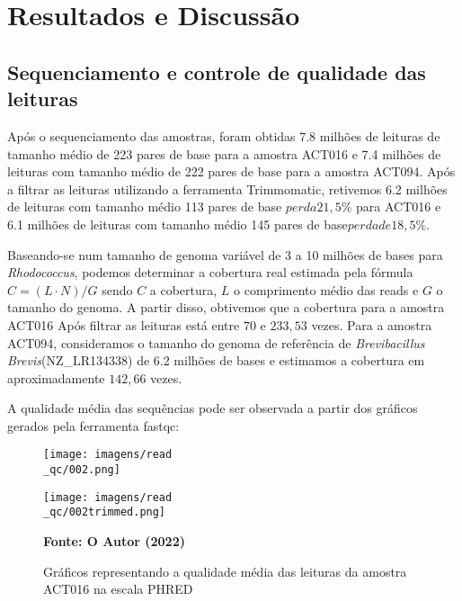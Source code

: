 \chapter{Resultados e Discussão}\label{cap:resultados}

\section{Sequenciamento e controle de qualidade das leituras}
Após o sequenciamento das amostras, foram obtidas 7.8 milhões de leituras de tamanho médio de 
223 pares de base para a amostra ACT016 e 7.4 milhões de leituras com tamanho médio de 222 pares de base
para a amostra ACT094. Após a filtrar as leituras utilizando a ferramenta Trimmomatic, retivemos
6.2 milhões de leituras com tamanho médio 113 pares de base \(perda 21,5\%\) para ACT016 e 6.1 milhões
de leituras com tamanho médio 145 pares de base\(perda de 18,5\%\).

Baseando-se num tamanho de genoma variável de 3 a 10 milhões de bases para \textit{Rhodococcus}, podemos
determinar a cobertura real estimada pela fórmula $C= (L\cdot N)/G $ sendo $C$ a cobertura, $L$ o comprimento
médio das reads e $G$ o tamanho do genoma. A partir disso, obtivemos que a cobertura para a amostra ACT016 Após
filtrar as leituras está entre $70$ e $233,53$ vezes. 
Para a amostra ACT094, consideramos o tamanho do genoma de referência de \textit{Brevibacillus Brevis}(NZ\_LR134338) 
de 6.2 milhões de bases e estimamos a cobertura em aproximadamente $142,66$ vezes.

A qualidade média das sequências pode ser observada a partir dos gráficos gerados pela ferramenta
fastqc:

\begin{figure}[!htb]
	\caption{Gráficos representando a qualidade média das leituras da amostra ACT016 na escala PHRED}
	\label{fig:fastqc_antes}
	\centering
	\begin{minipage}{.45\linewidth}
		\texttt{[image: imagens/read\\\_qc/002.png]}
	  \end{minipage}
	  \hspace{.05\linewidth}
	  \begin{minipage}{.45\linewidth}
		\texttt{[image: imagens/read\\\_qc/002trimmed.png]}
	  \end{minipage}
    \begin{small}\textbf{Fonte: O Autor (2022)}\end{small}
\end{figure}
